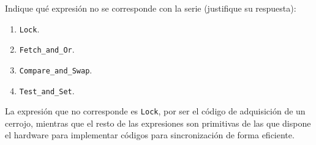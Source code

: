\begin{cuestion}
    Indique qué expresión no se corresponde con la serie (justifique su respuesta):
    \begin{enumerate}
        \item \verb|Lock|.
        \item \verb|Fetch_and_Or|.
        \item \verb|Compare_and_Swap|.
        \item \verb|Test_and_Set|.
    \end{enumerate}
    La expresión que no corresponde es \verb|Lock|, por ser el código de adquisición de un cerrojo, mientras que el resto de las expresiones son primitivas de las que dispone el hardware para implementar códigos para sincronización de forma eficiente.
\end{cuestion}
